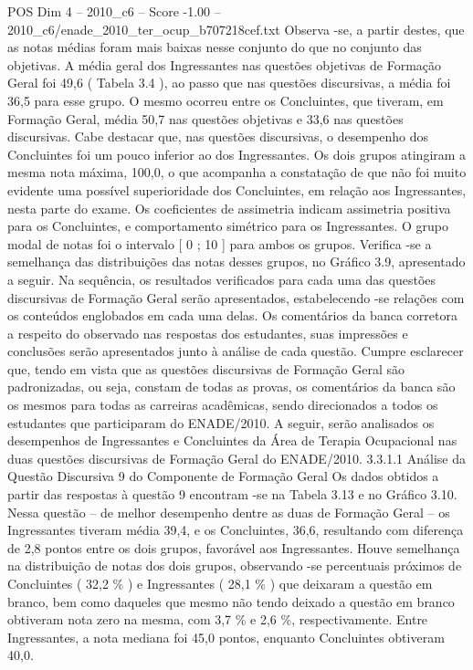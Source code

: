 \begin{textsample}{POS Dim 4 – 2010\_c6 – Score -1.00 – 2010\_c6/enade\_2010\_ter\_ocup\_b707218cef.txt}
Observa -se, a partir destes, que as notas médias foram mais baixas nesse conjunto do que no conjunto das objetivas.
A média geral dos Ingressantes nas questões objetivas de Formação Geral foi 49,6 ( Tabela 3.4 ), ao passo que nas questões discursivas, a média foi 36,5 para esse grupo.
O mesmo ocorreu entre os Concluintes, que tiveram, em Formação Geral, média 50,7 nas questões objetivas e 33,6 nas questões discursivas.
Cabe destacar que, nas questões discursivas, o desempenho dos Concluintes foi um pouco inferior ao dos Ingressantes.
Os dois grupos atingiram a mesma nota máxima, 100,0, o que acompanha a constatação de que não foi muito evidente uma possível superioridade dos Concluintes, em relação aos Ingressantes, nesta parte do exame.
Os coeficientes de assimetria indicam assimetria positiva para os Concluintes, e comportamento simétrico para os Ingressantes.
O grupo modal de notas foi o intervalo [ 0 ; 10 ] para ambos os grupos.
Verifica -se a semelhança das distribuições das notas desses grupos, no Gráfico 3.9, apresentado a seguir.
Na sequência, os resultados verificados para cada uma das questões discursivas de Formação Geral serão apresentados, estabelecendo -se relações com os conteúdos englobados em cada uma delas.
Os comentários da banca corretora a respeito do observado nas respostas dos estudantes, suas impressões e conclusões serão apresentados junto à análise de cada questão.
Cumpre esclarecer que, tendo em vista que as questões discursivas de Formação Geral são padronizadas, ou seja, constam de todas as provas, os comentários da banca são os mesmos para todas as carreiras acadêmicas, sendo direcionados a todos os estudantes que participaram do ENADE/2010.
A seguir, serão analisados os desempenhos de Ingressantes e Concluintes da Área de Terapia Ocupacional nas duas questões discursivas de Formação Geral do ENADE/2010. 3.3.1.1 Análise da Questão Discursiva 9 do Componente de Formação Geral Os dados obtidos a partir das respostas à questão 9 encontram -se na Tabela 3.13 e no Gráfico 3.10.
Nessa questão – de melhor desempenho dentre as duas de Formação Geral – os Ingressantes tiveram média 39,4, e os Concluintes, 36,6, resultando com diferença de 2,8 pontos entre os dois grupos, favorável aos Ingressantes.
Houve semelhança na distribuição de notas dos dois grupos, observando -se percentuais próximos de Concluintes ( 32,2 \% ) e Ingressantes ( 28,1 \% ) que deixaram a questão em branco, bem como daqueles que mesmo não tendo deixado a questão em branco obtiveram nota zero na mesma, com 3,7 \% e 2,6 \%, respectivamente.
Entre Ingressantes, a nota mediana foi 45,0 pontos, enquanto Concluintes obtiveram 40,0.

\end{textsample}
